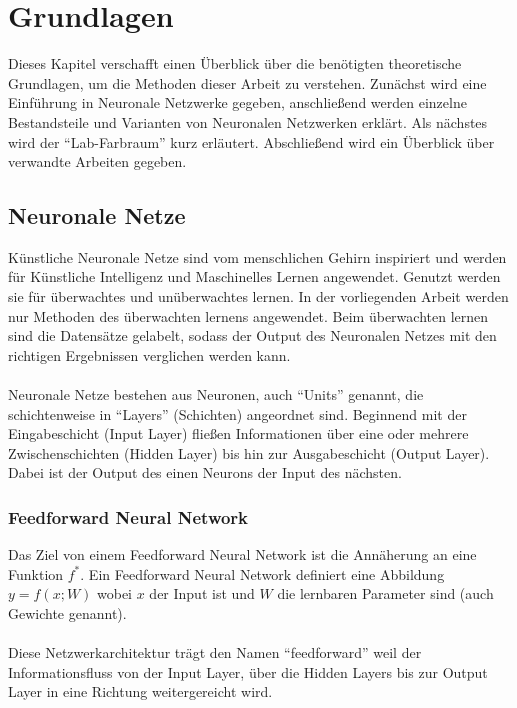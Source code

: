 \chapter{Grundlagen}
Dieses Kapitel verschafft einen Überblick über die benötigten theoretische Grundlagen, um die Methoden dieser Arbeit zu verstehen. 
Zunächst wird eine Einführung in Neuronale Netzwerke gegeben, anschließend werden
einzelne Bestandsteile und Varianten von Neuronalen Netzwerken erklärt. 
Als nächstes wird der ``Lab-Farbraum'' kurz erläutert. Abschließend wird ein Überblick über verwandte Arbeiten gegeben.

\section{Neuronale Netze}
Künstliche Neuronale Netze sind vom menschlichen Gehirn inspiriert und werden für Künstliche Intelligenz und Maschinelles Lernen
angewendet. Genutzt werden sie für überwachtes und unüberwachtes lernen. In der vorliegenden Arbeit werden nur Methoden des überwachten
lernens angewendet. Beim überwachten lernen sind die Datensätze gelabelt, sodass der Output des Neuronalen Netzes mit den richtigen Ergebnissen
verglichen werden kann.
\\
\\
Neuronale Netze bestehen aus Neuronen, auch ``Units'' genannt, die schichtenweise in ``Layers'' (Schichten) angeordnet sind.
Beginnend mit der Eingabeschicht (Input \gls{Layer}) fließen Informationen über eine oder mehrere Zwischenschichten (Hidden \gls{Layer}) bis hin zur 
Ausgabeschicht (Output \gls{Layer}). Dabei ist der Output des einen Neurons der Input des nächsten. \cite{neuronale-netze-aufbau}

\subsection{Feedforward Neural Network}
Das Ziel von einem Feedforward Neural Network ist die Annäherung an eine Funktion $ f^* $. Ein Feedforward Neural Network definiert 
eine Abbildung $ y = f(x;W) $ wobei $ x $ der Input ist und $ W $ die lernbaren Parameter sind (auch Gewichte genannt).
\cite[164-223]{Goodfellow-et-al-2016}
\\
\\
Diese Netzwerkarchitektur trägt den Namen ``feedforward'' weil der Informationsfluss von der Input \gls{Layer},
über die Hidden Layers bis zur Output \gls{Layer} in eine Richtung weitergereicht wird.


